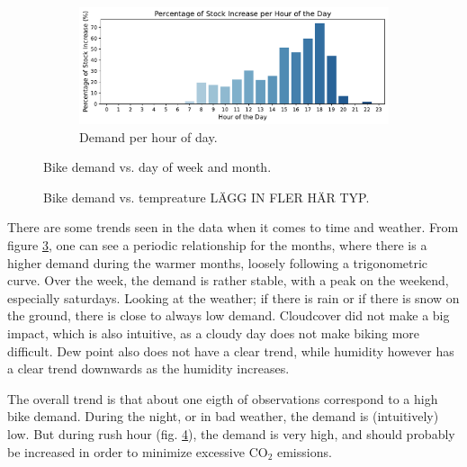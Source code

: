 \begin{figure}[htbp]
\begin{subfigure}{0.3\textwidth}
        \label{fig:demand month}
    \end{subfigure}
    \hfill
    \begin{subfigure}{0.3\textwidth}
        \centering
        \includegraphics[width=\textwidth]{demand_hour.pdf}
        \caption{Demand per hour of day.}
        \label{fig:demand hour}
    \end{subfigure}
    \caption{Bike demand vs. day of week and month.}
    \label{fig:demand day month}
\end{figure}

\begin{figure}[htbp]
    \centering
    
    \caption{Bike demand vs. tempreature LÄGG IN FLER HÄR TYP.}
    \label{fig:demand time of day}
\end{figure}

There are some trends seen in the data when it comes to time and weather. From figure \ref{fig:demand day month}, one can see a periodic relationship for the months, where there is a higher demand during the warmer months, loosely following a trigonometric curve. Over the week, the demand is rather stable, with a peak on the weekend, especially saturdays. Looking at the weather; if there is rain or if there is snow on the ground, there is close to always low demand. Cloudcover did not make a big impact, which is also intuitive, as a cloudy day does not make biking more difficult. Dew point also does not have a clear trend, while humidity however has a clear trend downwards as the humidity increases.

The overall trend is that about one eigth of observations correspond to a high bike demand. During the night, or in bad weather, the demand is (intuitively) low. But during rush hour (fig. \ref{fig:demand time of day}), the demand is very high, and should probably be increased in order to minimize excessive CO$_2$ emissions.